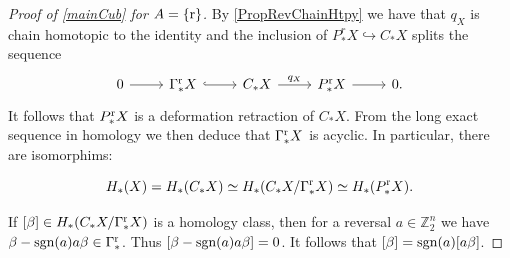 \documentclass[12pt]{amsart}
\theoremstyle{plain}
\numberwithin{lemma}{\DefaultNumberTheoremWithin}
\numberwithin{claim}{\DefaultNumberTheoremWithin}
\numberwithin{theorem}{\DefaultNumberTheoremWithin}
\numberwithin{corollary}{\DefaultNumberTheoremWithin}
\numberwithin{proposition}{\DefaultNumberTheoremWithin}
\numberwithin{conjecture}{\DefaultNumberTheoremWithin}
\theoremstyle{definition}
\theoremstyle{definition}
\numberwithin{question}{\DefaultNumberTheoremWithin}
\theoremstyle{definition}
\numberwithin{problem}{\DefaultNumberTheoremWithin}
\theoremstyle{remark}
\numberwithin{remark}{\DefaultNumberTheoremWithin}
\theoremstyle{remark}
\numberwithin{example}{\DefaultNumberTheoremWithin}
\def\blt{*}
\def\sgn{\textnormal{sgn}}
\def\rev{\textnormal{r}}
\def\pirev{q}
\def\Con{\mathrm{\Gamma}}  %
\def\rCon{\Con^{\rev}}   %
\begin{document}
\begin{proof}[Proof of \ref{mainCub} for $A=\{\rev\}$]
    By \ref{PropRevChainHtpy} we have that $\pirev_X$ is 
    chain homotopic to the identity and the inclusion of $P^r_\blt X \hookrightarrow C_\blt X$ 
    splits the sequence
    \[
    \begin{tikzcd}
    0\arrow{r}{}&\rCon_\blt X\arrow[hook]{r}{} &C_\blt X\arrow{r}{\pirev_X}&P^{\rev}_\blt X \arrow{r}&0.
    \end{tikzcd}
    \]
    It follows that $P^{\rev}_\blt X$ is a deformation 
    retraction of $C_\blt X$. From the long exact 
    sequence in homology we then deduce
    that $\rCon_\blt X$ is acyclic.
    In particular, there are isomorphims:

    \[
    H_\blt (X) = H_\blt(C_\blt X) \simeq H_\blt (C_\blt X /\rCon_\blt X ) \simeq H_\blt(P^\rev_\blt X).
    \]

    If $[\beta] \in H_\blt (C_\blt X /\rCon_\blt X )$ is a homology class, then
    for a reversal $a\in \mathbb{Z}_2^n$ we have $\beta-\sgn(a) a\beta \in \rCon_\blt$. Thus
    $[\beta-\sgn(a) a \beta] = 0$. It follows that $[\beta] = \sgn(a)[a\beta]$.
    
\end{proof}
\end{document}
